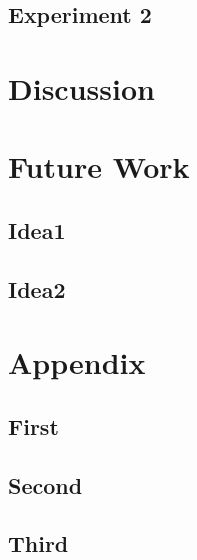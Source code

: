 \documentclass[12pt]{article}
\numberwithin{equation}{section} %
\numberwithin{figure}{section} %
\numberwithin{table}{section} %
\newcommand{\sectionInput}[1] {
  
}
\begin{document}
\subsection{Experiment 2}\label{subsection:3.2}
\sectionInput{3 - Results/Experiment2}

\section{Discussion}\label{section:4}
\sectionInput{4 - Discussion/Discussion}

\section{Future Work}\label{section:5}
\subsection{Idea1}\label{subsection:5.1}
\sectionInput{5 - Future/Idea1}

\subsection{Idea2}\label{subsection:5.2}
\sectionInput{5 - Future/Idea2}

\newpage
\sectionInput{Bibliography}

\newpage
\appendix
\section{Appendix}\label{section:6}
\subsection{First}\label{App:1}
\sectionInput{6 - Appendix/First}
\clearpage

\subsection{Second}\label{App:2}
\sectionInput{6 - Appendix/Second}
\clearpage

\subsection{Third}\label{App:3}
\sectionInput{6 - Appendix/Third}
\clearpage
\end{document}
